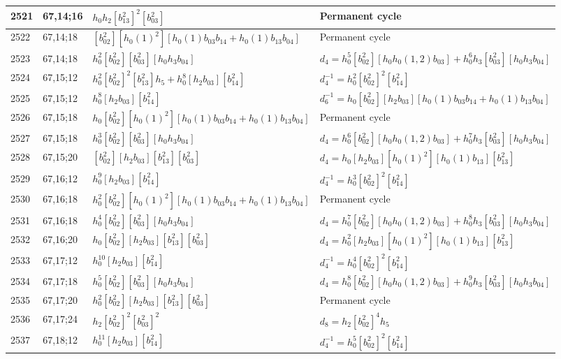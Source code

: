 \documentclass{article}
\begin{document}
\begin{longtable}{|l|l|>{\raggedright\arraybackslash}p{6cm}|>{\raggedright\arraybackslash}p{6cm}|}
\hline
2521 & 67,14;16 & $h_0h_2[b_{13}^2]^2[b_{03}^2]$ & Permanent cycle\\
\hline
2522 & 67,14;18 & $[b_{02}^2][h_0(1)^2][h_0(1)b_{03}b_{14} + h_0(1)b_{13}b_{04}]$ & Permanent cycle\\
2523 & 67,14;18 & $h_0^2[b_{02}^2][b_{03}^2][h_0h_3b_{04}]$ &$d_{4}=h_0^5[b_{02}^2][h_0h_0(1, 2)b_{03}] + h_0^6h_3[b_{03}^2][h_0h_3b_{04}]$\\
\hline
2524 & 67,15;12 & $h_0^2[b_{02}^2]^2[b_{13}^2]h_5 + h_0^8[h_2b_{03}][b_{14}^2]$ & $d_{4}^{-1}=h_0^2[b_{02}^2]^2[b_{14}^2]$\\
2525 & 67,15;12 & $h_0^8[h_2b_{03}][b_{14}^2]$ & $d_{6}^{-1}=h_0[b_{02}^2][h_2b_{03}][h_0(1)b_{03}b_{14} + h_0(1)b_{13}b_{04}]$\\
\hline
2526 & 67,15;18 & $h_0[b_{02}^2][h_0(1)^2][h_0(1)b_{03}b_{14} + h_0(1)b_{13}b_{04}]$ & Permanent cycle\\
2527 & 67,15;18 & $h_0^3[b_{02}^2][b_{03}^2][h_0h_3b_{04}]$ &$d_{4}=h_0^6[b_{02}^2][h_0h_0(1, 2)b_{03}] + h_0^7h_3[b_{03}^2][h_0h_3b_{04}]$\\
\hline
2528 & 67,15;20 & $[b_{02}^2][h_2b_{03}][b_{13}^2][b_{03}^2]$ &$d_{4}=h_0[h_2b_{03}][h_0(1)^2][h_0(1)b_{13}][b_{13}^2]$\\
\hline
2529 & 67,16;12 & $h_0^9[h_2b_{03}][b_{14}^2]$ & $d_{4}^{-1}=h_0^3[b_{02}^2]^2[b_{14}^2]$\\
\hline
2530 & 67,16;18 & $h_0^2[b_{02}^2][h_0(1)^2][h_0(1)b_{03}b_{14} + h_0(1)b_{13}b_{04}]$ & Permanent cycle\\
2531 & 67,16;18 & $h_0^4[b_{02}^2][b_{03}^2][h_0h_3b_{04}]$ &$d_{4}=h_0^7[b_{02}^2][h_0h_0(1, 2)b_{03}] + h_0^8h_3[b_{03}^2][h_0h_3b_{04}]$\\
\hline
2532 & 67,16;20 & $h_0[b_{02}^2][h_2b_{03}][b_{13}^2][b_{03}^2]$ &$d_{4}=h_0^2[h_2b_{03}][h_0(1)^2][h_0(1)b_{13}][b_{13}^2]$\\
\hline
2533 & 67,17;12 & $h_0^{10}[h_2b_{03}][b_{14}^2]$ & $d_{4}^{-1}=h_0^4[b_{02}^2]^2[b_{14}^2]$\\
\hline
2534 & 67,17;18 & $h_0^5[b_{02}^2][b_{03}^2][h_0h_3b_{04}]$ &$d_{4}=h_0^8[b_{02}^2][h_0h_0(1, 2)b_{03}] + h_0^9h_3[b_{03}^2][h_0h_3b_{04}]$\\
\hline
2535 & 67,17;20 & $h_0^2[b_{02}^2][h_2b_{03}][b_{13}^2][b_{03}^2]$ & Permanent cycle\\
\hline
2536 & 67,17;24 & $h_2[b_{02}^2]^2[b_{03}^2]^2$ &$d_{8}=h_2[b_{02}^2]^4h_5$\\
\hline
2537 & 67,18;12 & $h_0^{11}[h_2b_{03}][b_{14}^2]$ & $d_{4}^{-1}=h_0^5[b_{02}^2]^2[b_{14}^2]$\\

\end{longtable}
\end{document}
